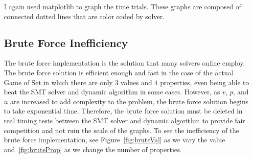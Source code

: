 \documentclass[pageno]{jpaper}
\begin{document}
I again used matplotlib to graph the time trials. These graphs are composed of connected dotted lines that are color coded by solver. 


\subsection{Brute Force Inefficiency}

The brute force implementation is the solution that many solvers online employ. The brute force solution is efficient enough and fast in the case of the actual Game of Set in which there are only $3$ values and $4$ properties, even being able to beat the SMT solver and dynamic algorithm in some cases. However, as $v$, $p$, and $n$ are increased to add complexity to the problem, the brute force solution begins to take exponential time. Therefore, the brute force solution must be deleted in real timing tests between the SMT solver and dynamic algorithm to provide fair competition and not ruin the scale of the graphs. To see the inefficiency of the brute force implementation, see Figure~\ref{fig:bruteVal} as we vary the value and~\ref{fig:bruteProp} as we change the number of properties.
\end{document}
